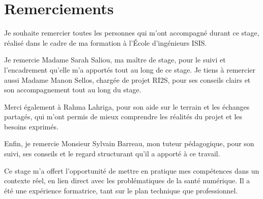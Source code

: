 \chapter*{Remerciements}
\mtcaddchapter[Remerciements]

\vspace{1em}

Je souhaite remercier toutes les personnes qui m’ont accompagné durant ce stage, réalisé dans le cadre de ma formation à l’École d’ingénieurs ISIS.

Je remercie Madame Sarah Saliou, ma maître de stage, pour le suivi et l'encadrement qu’elle m’a apportés tout au long de ce stage.
Je tiens à remercier aussi Madame Manon Sellos, chargée de projet RI2S, pour ses conseils clairs et son accompagnement tout au long du stage.

Merci également à Rahma Lahriga, pour son aide sur le terrain et les échanges partagés, qui m’ont permis de mieux comprendre les réalités du projet et les besoins exprimés.

Enfin, je remercie Monsieur Sylvain Barreau, mon tuteur pédagogique, pour son suivi, ses conseils et le regard structurant qu’il a apporté à ce travail.

Ce stage m’a offert l’opportunité de mettre en pratique mes compétences dans un contexte réel, en lien direct avec les problématiques de la santé numérique. Il a été une expérience formatrice, tant sur le plan technique que professionnel.